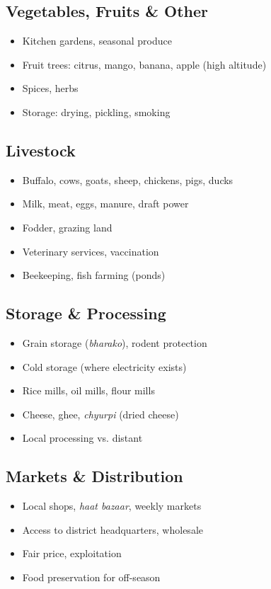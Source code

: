 \documentclass[11pt,a4paper]{article}
\begin{document}
\subsection{Vegetables, Fruits \& Other}
\begin{itemize}
    \item Kitchen gardens, seasonal produce
    \item Fruit trees: citrus, mango, banana, apple (high altitude)
    \item Spices, herbs
    \item Storage: drying, pickling, smoking
\end{itemize}

\subsection{Livestock}
\begin{itemize}
    \item Buffalo, cows, goats, sheep, chickens, pigs, ducks
    \item Milk, meat, eggs, manure, draft power
    \item Fodder, grazing land
    \item Veterinary services, vaccination
    \item Beekeeping, fish farming (ponds)
\end{itemize}

\subsection{Storage \& Processing}
\begin{itemize}
    \item Grain storage (\textit{bharako}), rodent protection
    \item Cold storage (where electricity exists)
    \item Rice mills, oil mills, flour mills
    \item Cheese, ghee, \textit{chyurpi} (dried cheese)
    \item Local processing vs. distant
\end{itemize}

\subsection{Markets \& Distribution}
\begin{itemize}
    \item Local shops, \textit{haat bazaar}, weekly markets
    \item Access to district headquarters, wholesale
    \item Fair price, exploitation
    \item Food preservation for off-season
\end{itemize}
\end{document}
